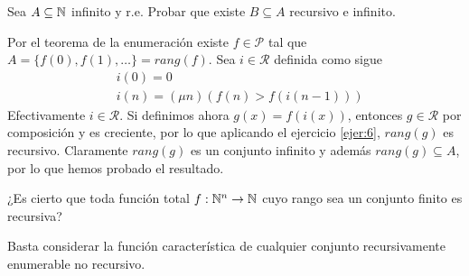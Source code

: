 \documentclass[twoside]{article}
\begin{document}
\newpage

\begin{ejercicio}{8}
Sea $A \subseteq \mathbb{N}$ infinito y r.e. Probar que existe $B \subseteq A$ recursivo e infinito.
\end{ejercicio}
\begin{solucion}
Por el teorema de la enumeración existe $f\in\mathcal{P}$ tal que $A=\{f(0),f(1),\dots\}=rang(f)$. Sea $i\in\mathcal{R}$ definida como sigue
\begin{align*}
&i(0)=0\\
&i(n)=(\mu n)(f(n)> f(i(n-1)))
\end{align*}
Efectivamente $i\in\mathcal{R}$. Si definimos ahora $g(x)=f(i(x))$, entonces $g\in\mathcal{R}$ por composición y es creciente, por lo que aplicando el ejercicio \ref{ejer:6}, $rang(g)$ es recursivo. Claramente $rang(g)$ es un conjunto infinito y además $rang(g)\subseteq A$, por lo que hemos probado el resultado.
\end{solucion}

\newpage

\begin{ejercicio}{11}
¿Es cierto que toda función total $f : \mathbb{N}^n \to \mathbb{N}$ cuyo rango sea un conjunto finito es
recursiva?
\end{ejercicio}
\begin{solucion}
Basta considerar la función característica de cualquier conjunto recursivamente enumerable no recursivo. 
\end{solucion}
\end{document}
